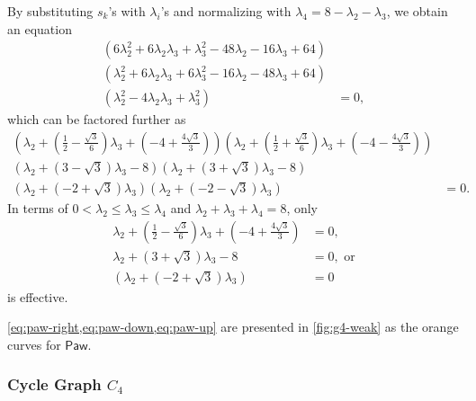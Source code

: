 \documentclass{article}
\theoremstyle{definition}
\newcommand{\Paw}{\mathsf{Paw}}
\begin{document}
By substituting $s_k$'s with $\lambda_i$'s and normalizing with $\lambda_4 = 8 - \lambda_2 - \lambda_3$, we obtain an equation  
\begin{align*}
(6\lambda_2^2 + 6\lambda_2\lambda_3 + \lambda_3^2 - 48\lambda_2 - 16\lambda_3 + 64) & \\
(\lambda_2^2 + 6\lambda_2\lambda_3 + 6\lambda_3^2 - 16\lambda_2 - 48\lambda_3 + 64) & \\ 
(\lambda_2^2 - 4\lambda_2\lambda_3 + \lambda_3^2) &= 0,
\end{align*}
which can be factored further as 
\[
    \begin{aligned}
        (\lambda_2 + (\frac{1}{2} - \frac{\sqrt{3}}{6})\lambda_3 + (-4 + \frac{4\sqrt{3}}{3}))
(\lambda_2 + (\frac{1}{2} + \frac{\sqrt{3}}{6})\lambda_3 + (-4 - \frac{4\sqrt{3}}{3})) & \\
(\lambda_2 + (3 - \sqrt{3})\lambda_3 - 8)
(\lambda_2 + (3 + \sqrt{3})\lambda_3 - 8) & \\
(\lambda_2 + (-2 + \sqrt{3})\lambda_3)
(\lambda_2 + (-2 - \sqrt{3})\lambda_3) &= 0.
    \end{aligned}
\]
In terms of $0 < \lambda_2 \leq \lambda_3 \leq \lambda_4$ and $\lambda_2 + \lambda_3 + \lambda_4 = 8$, only 
\begin{align}
    \lambda_2 + (\frac{1}{2} - \frac{\sqrt{3}}{6})\lambda_3 + (-4 + \frac{4\sqrt{3}}{3}) &= 0, \label{eq:paw-right} \\
    \lambda_2 + (3 + \sqrt{3})\lambda_3 - 8 &= 0, \text{ or} \label{eq:paw-down} \\
    (\lambda_2 + (-2 + \sqrt{3})\lambda_3) &= 0 \label{eq:paw-up}
\end{align}
is effective.

\cref{eq:paw-right,eq:paw-down,eq:paw-up} are presented in \cref{fig:g4-weak} as the orange curves for $\Paw$.

\subsubsection{Cycle Graph \texorpdfstring{$C_4$}{C4}}
\end{document}
